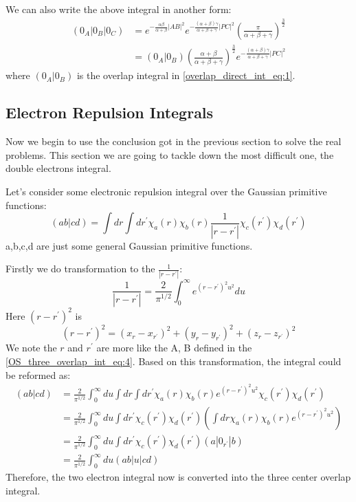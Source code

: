We can also write the above integral in another form:
\begin{equation}
 \begin{split}
  (0_{A}|0_{B}|0_{C}) &= e^{-\frac{\alpha\beta}{\alpha+\beta}|AB|^{2}}
e^{-\frac{(\alpha+\beta)\gamma}{\alpha+\beta+\gamma}|PC|^{2}} 
\left( \frac{\pi}{\alpha+\beta+\gamma}\right)^{\frac{3}{2}} \\
&= (0_{A}|0_{B})\left( \frac{\alpha+\beta}{\alpha+\beta+\gamma}\right)^{\frac{3}{2}}
e^{-\frac{(\alpha+\beta)\gamma}{\alpha+\beta+\gamma}|PC|^{2}} 
 \end{split}
 \label{OS_bottom_three_overlap_int_2}
\end{equation}
where $(0_{A}|0_{B})$ is the overlap integral in \ref{overlap_direct_int_eq:1}.

\subsection{Electron Repulsion Integrals}
\label{os_eri}
%
%
%
%
Now we begin to use the conclusion got in the previous section to solve the
real problems. This section we are going to tackle down the most difficult one,
the double electrons integral.

Let's consider some electronic repulsion integral over the
Gaussian primitive functions:
\begin{equation}
 \label{OS_ERI_eq:1}
(ab|cd) = \int dr \int dr^{'} \chi_{a}(r)\chi_{b}(r)\frac{1}{|r-r^{'}|}
\chi_{c}(r^{'})\chi_{d}(r^{'})
\end{equation}
a,b,c,d are just some general Gaussian primitive functions.

Firstly we do transformation to the $\frac{1}{|r-r^{'}|}$:
\begin{equation}
 \frac{1}{|r-r^{'}|} = \frac{2}{\pi^{1/2}}\int^{\infty}_{0}
e^{(r-r^{'})^{2}u^{2}}du
\end{equation}
Here $(r-r^{'})^{2}$ is 
\begin{equation}
(r-r^{'})^{2} = (x_{r}-x_{r^{'}})^{2} +  (y_{r}-y_{r^{'}})^{2} +
(z_{r}-z_{r^{'}})^{2}
\end{equation}
We note the $r$ and $r^{'}$ are more like the A, B defined in the 
\ref{OS_three_overlap_int_eq:4}. Based on this transformation,
the integral could be reformed as:
\begin{equation}
 \begin{split}
 (ab|cd) &= \frac{2}{\pi^{1/2}}\int^{\infty}_{0} du 
\int dr \int dr^{'} \chi_{a}(r)\chi_{b}(r) e^{(r-r^{'})^{2}u^{2}}
\chi_{c}(r^{'})\chi_{d}(r^{'}) \\
&= \frac{2}{\pi^{1/2}}\int^{\infty}_{0} du
\int dr^{'}\chi_{c}(r^{'})\chi_{d}(r^{'}) 
\left( \int dr  \chi_{a}(r)\chi_{b}(r) e^{(r-r^{'})^{2}u^{2}}\right) \\ 
&= \frac{2}{\pi^{1/2}}\int^{\infty}_{0} du
\int dr^{'}\chi_{c}(r^{'})\chi_{d}(r^{'})(a|0_{r^{'}}|b) \\
&= \frac{2}{\pi^{1/2}}\int^{\infty}_{0} du (ab|u|cd)
 \end{split}
\label{OS_ERI_eq:2}
\end{equation}
Therefore, the two electron integral now is converted into the three
center overlap integral.

